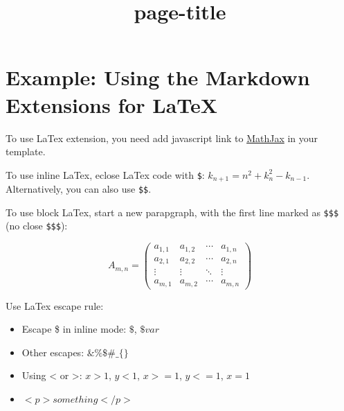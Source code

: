 \documentclass{article}
\title{{page-title}}
\date{}
\begin{document}
\maketitle


\section*{Example: Using the Markdown Extensions for LaTeX}



To use LaTex extension, you need add javascript
link to \href{http://www.mathjax.org/}{MathJax} in
your template.


To use inline LaTex, eclose LaTex code with \texttt{\$}:
$k_{n+1} = n^2 + k_n^2 - k_{n-1}$. Alternatively,
you can also use \texttt{\$\$}.


To use block LaTex, start a new parapgraph, with
the first line marked as \texttt{\$\$\$} (no close \texttt{\$\$\$}):


\begin{equation}
A_{m,n} =
 \begin{pmatrix}
  a_{1,1} & a_{1,2} & \cdots & a_{1,n} \\
  a_{2,1} & a_{2,2} & \cdots & a_{2,n} \\
  \vdots  & \vdots  & \ddots & \vdots  \\
  a_{m,1} & a_{m,2} & \cdots & a_{m,n}
 \end{pmatrix}
\end{equation}




Use LaTex escape rule:
\begin{itemize}
\item Escape \$ in inline mode: $\$$, $\$var$

\item Other escapes: $\& \% \$ \# \_ \{ \}$

\item Using < or >: $x > 1$, $y < 1$, $x >= 1$,
$y <= 1$, $x = 1$

\item $<p>something</p>$

\end{itemize}
\end{document}
